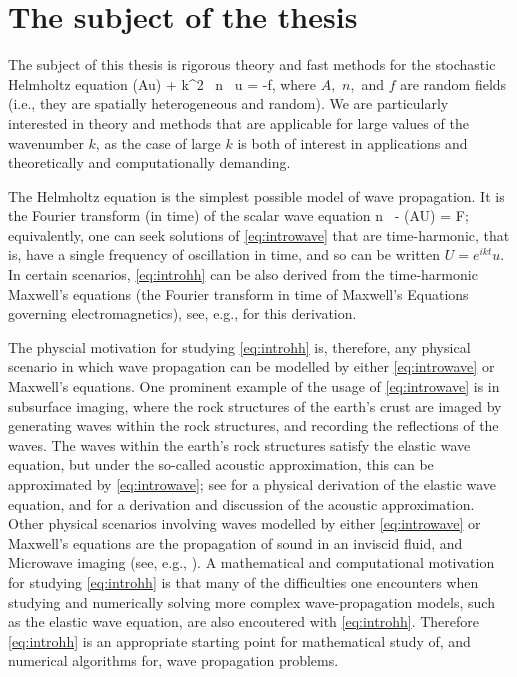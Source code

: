 \section{The subject of the thesis}

The subject of this thesis is rigorous theory and fast methods for the stochastic Helmholtz equation
\beq\label{eq:introhh}
\grad \cdot \mleft(A\grad u\mright) + k^2 \, n \, u = -f,
\eeq
where $A,$ $n,$ and $f$ are random fields (i.e., they are spatially heterogeneous and random). We are particularly interested in theory and methods that are applicable for large values of the wavenumber $k$, as the case of large $k$ is both of interest in applications and theoretically and computationally demanding.

The Helmholtz equation is the simplest possible model of wave propagation. It is the Fourier transform (in time) of the scalar wave equation
\beq\label{eq:introwave}
n \,  - \grad \cdot\mleft(A\grad U\mright) = F;
\eeq
equivalently, one can seek solutions of \eqref{eq:introwave} that are time-harmonic, that is, have a single frequency of oscillation in time, and so can be written $U = e^{ikt}u$. In certain scenarios, 
\eqref{eq:introhh} can be also derived from the time-harmonic Maxwell's equations (the Fourier transform in time of Maxwell's Equations governing electromagnetics), see, e.g., \cite[Remark 2.1]{MoSp:19} for this derivation.

The physcial motivation for studying \eqref{eq:introhh} is, therefore, any physical scenario in which wave propagation can be modelled by either \eqref{eq:introwave} or Maxwell's equations. One prominent example of the usage of \eqref{eq:introwave} is in subsurface imaging, where the rock structures of the earth's crust are imaged by generating waves within the rock structures, and recording the reflections of the waves. The waves within the earth's rock structures satisfy the elastic wave equation, but under the so-called acoustic approximation, this can be approximated by \eqref{eq:introwave}; see \cite[Section 1.2]{Ch:15} for a physical derivation of the elastic wave equation, and \cite[Section 1.2.6]{Ch:15} for a derivation and discussion of the acoustic approximation. Other physical scenarios involving waves modelled by either \eqref{eq:introwave} or Maxwell's equations are the propagation of sound in an inviscid fluid\cite[Section 2.1]{CoKr:13}, and Microwave imaging (see, e.g., \cite[Section 6.4]{BoDoGrSpTo:19}). A mathematical and computational motivation for studying \eqref{eq:introhh} is that many of the difficulties one encounters when studying and numerically solving more complex wave-propagation models, such as the elastic wave equation, are also encoutered with \eqref{eq:introhh}. Therefore \eqref{eq:introhh} is an appropriate starting point for mathematical study of, and numerical algorithms for, wave propagation problems.


